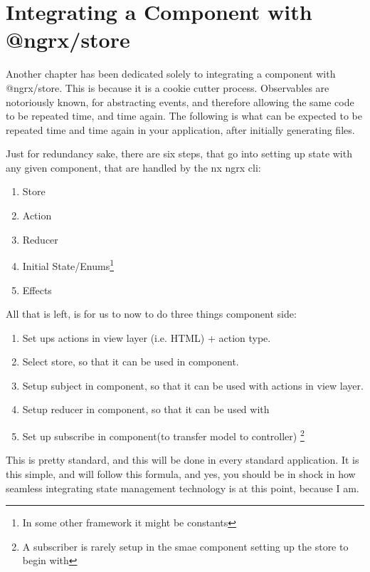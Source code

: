 \maketitle{}
\section{ Integrating a Component with @ngrx/store }

Another chapter has been dedicated solely to integrating a component
with @ngrx/store. This is because it is a cookie cutter process. Observables
are notoriously known, for abstracting events, and therefore allowing the same
code to be repeated time, and time again. The following is what can be expected
to be repeated time and time again in your application, after initially
generating files.

Just for redundancy sake, there are six steps, that go into setting up state
with any given component, that are handled by the nx ngrx cli:
\begin{enumerate}
  \item Store
  \item Action
  \item Reducer
  \item Initial State/Enums\footnote{In some other framework it might be constants}
  \item Effects
\end{enumerate}

All that is left, is for us to now to do three things component side:

\begin{enumerate}
  \item Set ups actions in view layer (i.e. HTML) + action type.
  \item Select store, so that it can be used in component.
  \item Setup subject in component, so that it can be used with actions in view layer.
  \item Setup reducer in component, so that it can be used with
  \item Set up subscribe in component(to transfer model to controller) \footnote{A subscriber is rarely setup in the smae component setting up the store to begin with}
\end{enumerate}

This is pretty standard, and this will be done in every standard application.
It is this simple, and will follow this formula, and yes, you should be in shock
in how seamless integrating state management technology is at this point,
because I am.

